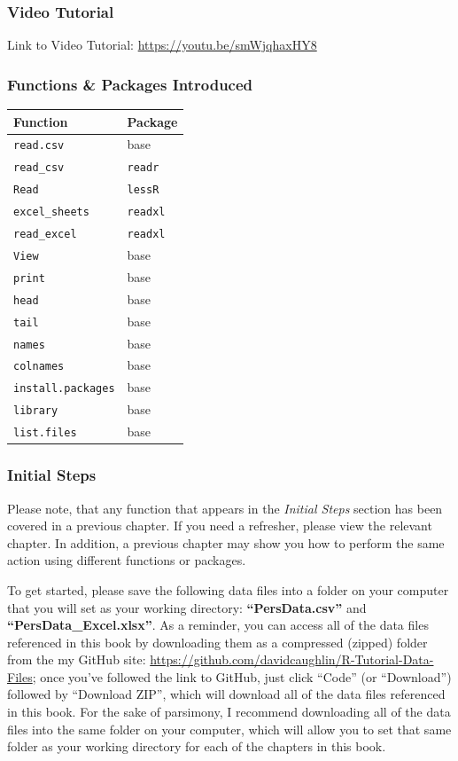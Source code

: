 \documentclass[]{book}
\begin{document}
\subsubsection{Video Tutorial}\label{video-tutorial}

Link to Video Tutorial: \url{https://youtu.be/smWjqhaxHY8}

\subsubsection{Functions \& Packages
Introduced}\label{functions-packages-introduced}

\begin{longtable}[]{@{}ll@{}}
\toprule
Function & Package\tabularnewline
\midrule
\endhead
\texttt{read.csv} & base\tabularnewline
\texttt{read\_csv} & \texttt{readr}\tabularnewline
\texttt{Read} & \texttt{lessR}\tabularnewline
\texttt{excel\_sheets} & \texttt{readxl}\tabularnewline
\texttt{read\_excel} & \texttt{readxl}\tabularnewline
\texttt{View} & base\tabularnewline
\texttt{print} & base\tabularnewline
\texttt{head} & base\tabularnewline
\texttt{tail} & base\tabularnewline
\texttt{names} & base\tabularnewline
\texttt{colnames} & base\tabularnewline
\texttt{install.packages} & base\tabularnewline
\texttt{library} & base\tabularnewline
\texttt{list.files} & base\tabularnewline
\bottomrule
\end{longtable}

\subsubsection{Initial Steps}\label{initial-steps}

Please note, that any function that appears in the \emph{Initial Steps}
section has been covered in a previous chapter. If you need a refresher,
please view the relevant chapter. In addition, a previous chapter may
show you how to perform the same action using different functions or
packages.

To get started, please save the following data files into a folder on
your computer that you will set as your working directory:
\textbf{``PersData.csv''} and \textbf{``PersData\_Excel.xlsx''}. As a
reminder, you can access all of the data files referenced in this book
by downloading them as a compressed (zipped) folder from the my GitHub
site: \url{https://github.com/davidcaughlin/R-Tutorial-Data-Files}; once
you've followed the link to GitHub, just click ``Code'' (or
``Download'') followed by ``Download ZIP'', which will download all of
the data files referenced in this book. For the sake of parsimony, I
recommend downloading all of the data files into the same folder on your
computer, which will allow you to set that same folder as your working
directory for each of the chapters in this book.
\end{document}
